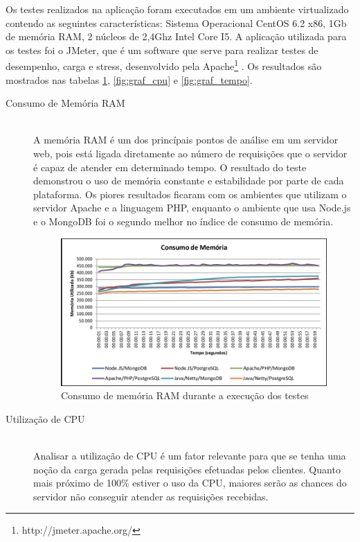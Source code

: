 Os testes realizados na aplicação foram executados em um ambiente virtualizado contendo as seguintes características: Sistema Operacional CentOS 6.2 x86, 1Gb de memória RAM, 2 núcleos de 2,4Ghz Intel Core I5. A aplicação utilizada para os testes foi o JMeter, que é um software que serve para realizar testes de desempenho, carga e stress, desenvolvido pela Apache\footnote{http://jmeter.apache.org/} . Os resultados são mostrados nas tabelas \ref{fig:graf_memoria}, \ref{fig:graf_cpu} e \ref{fig:graf_tempo}.
\clearpage
\begin{description}
\item[Consumo de Memória RAM] \hfill \\
A memória RAM é um dos princípais pontos de análise em um servidor web, pois está ligada diretamente ao número de requisições que o servidor é capaz de atender em determinado tempo.\cite{NodejsEMongodb}
O resultado do teste demonstrou o uso de memória constante e estabilidade por parte de cada plataforma. Os piores resultados ficaram com os ambientes que utilizam o servidor Apache e a linguagem PHP, enquanto o ambiente que usa Node.js e o MongoDB foi o segundo melhor no índice de consumo de memória.

\begin{figure}[htb!]
\centering
\includegraphics[scale=0.5]{images/graf_memoria.png}
\caption{Consumo de memória RAM durante a execução dos testes \cite{NodejsEMongodb}}
\label{fig:graf_memoria}
\end{figure}

\clearpage
 
\item[Utilização de CPU] \hfill \\
Analisar a utilização de CPU é um fator relevante para que se tenha uma noção da carga gerada pelas requisições efetuadas pelos clientes. Quanto mais próximo de 100\% estiver o uso da CPU, maiores serão as chances do servidor não conseguir atender as requisições recebidas. 


\end{description}
